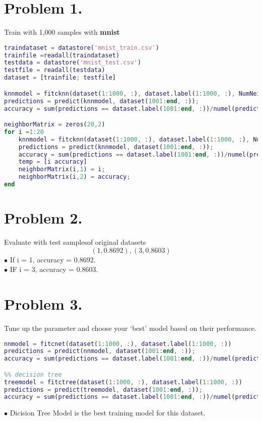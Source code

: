 \documentclass[12pt]{article}
\begin{document}
 

\rhead{\today}
 
\section*{Problem 1.}
Train with 1,000 samples with \textbf{mnist}
\begin{lstlisting}[language = Matlab]
traindataset = datastore('mnist_train.csv')
trainfile =readall(traindataset)
testdata = datastore('mnist_test.csv')
testfile = readall(testdata)
dataset = [trainfile; testfile] 

knnmodel = fitcknn(dataset(1:1000, :), dataset.label(1:1000, :), NumNeighbors=10) 
predictions = predict(knnmodel, dataset(1001:end, :)); 
accuracy = sum(predictions == dataset.label(1001:end, :))/numel(predictions) 

neighborMatrix = zeros(20,2)
for i =1:20
    knnmodel = fitcknn(dataset(1:1000, :), dataset.label(1:1000, :), NumNeighbors=i);
    predictions = predict(knnmodel, dataset(1001:end, :));
    accuracy = sum(predictions == dataset.label(1001:end, :))/numel(predictions);
    temp = [i accuracy]
    neighborMatrix(i,1) = i;
    neighborMatrix(i,2) = accuracy;
end
    \end{lstlisting}

\section*{Problem 2.}
Evaluate with test samplesof original datasets
\[(1, 0.8692), (3, 0.8603)\]
$\bullet$ If i = 1, accuracy = 0.8692. \\
$\bullet$ IF i = 3, accuracy = 0.8603.

\section*{Problem 3.}
Tune up the parameter and choose your `best' model based on their performance.
\begin{lstlisting}[language = Matlab]
%% neural network
nnmodel = fitcnet(dataset(1:1000, :), dataset.label(1:1000, :))
predictions = predict(nnmodel, dataset(1001:end, :));
accuracy = sum(predictions == dataset.label(1001:end, :))/numel(predictions) %0.2071

%% decision tree
treemodel = fitctree(dataset(1:1000, :), dataset.label(1:1000, :))
predictions = predict(treemodel, dataset(1001:end, :));
accuracy = sum(predictions == dataset.label(1001:end, :))/numel(predictions) %1
\end{lstlisting}
$\bullet$ Dicision Tree Model is the best training model for this dataset.
    
\end{document}
